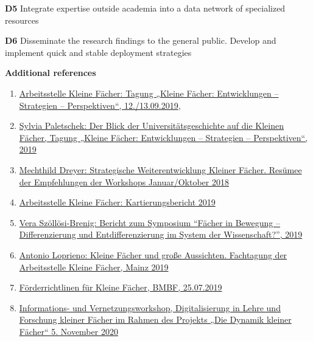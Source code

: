 \documentclass[
  english,
  paper=a4,
  oneside,captions=tableheading
]{scrbook}
\providecommand{\tightlist}{%
  \setlength{\itemsep}{0pt}\setlength{\parskip}{0pt}}
\begin{document}
\textbf{D5} Integrate expertise outside academia into a data network of
specialized resources

\textbf{D6} Disseminate the research findings to the general public.
Develop and implement quick and stable deployment strategies

\textbf{Additional references }

\begin{enumerate}
\def\labelenumi{\arabic{enumi}.}
\tightlist
\item
  \href{https://www.kleinefaecher.de/beitraege/blogbeitrag/dokumentation-zur-tagung-kleine-faecher-entwicklungen-strategien-perspektiven.html}{Arbeitsstelle
  Kleine Fächer: Tagung „Kleine Fächer: Entwicklungen -- Strategien --
  Perspektiven``, 12./13.09.2019},
\item
  \href{https://www.kleinefaecher.de/fileadmin/user_upload/img/Abschlusstagung_2019_Der_Blick_der_Universitaetsgeschichte_auf_die_Kleinen_Faecher_Paletschek.pdf}{Sylvia
  Paletschek: Der Blick der Universitätsgeschichte auf die Kleinen
  Fächer, Tagung „Kleine Fächer: Entwicklungen -- Strategien --
  Perspektiven``, 2019}
\item
  \href{https://www.kleinefaecher.de/fileadmin/user_upload/img/Abschlusstagung_2019_Strategische_Weiterentwicklung_Kleiner_Faecher_Dreyer.pdf}{Mechthild
  Dreyer: Strategische Weiterentwicklung Kleiner Fächer. Resümee der
  Empfehlungen der Workshops Januar/Oktober 2018}
\item
  \href{https://www.kleinefaecher.de/fileadmin/user_upload/img/Kartierungsbericht_2019.pdf}{Arbeitsstelle
  Kleine Fächer: Kartierungsbericht 2019}
\item
  \href{https://www.volkswagenstiftung.de/sites/default/files/downloads/2019-05\%20Bericht_Fächer-in-Bewegung.pdf}{Vera
  Szöllösi-Brenig: Bericht zum Symposium ``Fächer in Bewegung --
  Differenzierung und Entdifferenzierung im System der Wissenschaft?'',
  2019}
\item
  \href{https://www.kleinefaecher.de/fileadmin/user_upload/img/Abschlusstagung_2019_Eroeffnungsvortrag_Kleine_Faecher_grosse_Aussichten_Loprieno.pdf}{Antonio
  Loprieno: Kleine Fächer und große Aussichten. Fachtagung der
  Arbeitsstelle Kleine Fächer, Mainz 2019}
\item
  \href{https://www.bmbf.de/foerderungen/bekanntmachung-2604.html}{Förderrichtlinen
  für Kleine Fächer, BMBF, 25.07.2019}
\item
  \href{https://www.dropbox.com/s/6yza1yuih8cvjzx/Programm_Digitalisierungsworkshop_kleine_F\%C3\%A4cher_Nov_digital.pdf?dl=0}{Informations-
  und Vernetzungsworkshop, Digitalisierung in Lehre und Forschung
  kleiner Fächer im Rahmen des Projekts „Die Dynamik kleiner Fächer`` 5.
  November 2020}
\end{enumerate}
\end{document}
